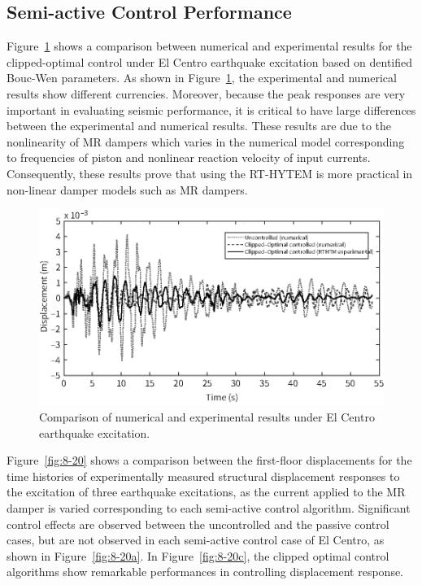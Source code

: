\subsection{Semi-active Control Performance}
Figure~\ref{fig:8-19} shows a comparison between numerical and experimental results for the clipped-optimal control under El Centro earthquake excitation based on dentified Bouc-Wen parameters. As shown in Figure~\ref{fig:8-19}, the experimental and numerical results show different currencies. Moreover, because the peak responses are very important in evaluating seismic performance, it is critical to have large differences between the experimental and numerical results. These results are due to the nonlinearity of MR dampers which varies in the numerical model corresponding to frequencies of piston and nonlinear reaction velocity of input currents. Consequently, these results prove that using the RT-HYTEM is more practical in non-linear damper models such as MR dampers.

\begin{figure}[H]
\centering
\includegraphics[width=1\textwidth] {figure/8-19.eps}
\caption{Comparison of numerical and experimental results under El Centro earthquake excitation.}
\label{fig:8-19}
\end{figure}

Figure~\ref{fig:8-20} shows a comparison between the first-floor displacements for the time histories of experimentally measured structural displacement responses to the excitation of three earthquake excitations, as the current applied to the MR damper is varied corresponding to each semi-active control algorithm. Significant control effects are observed between the uncontrolled and the passive control cases, but are not observed in each semi-active control case of El Centro, as shown in Figure~\ref{fig:8-20a}. In Figure~\ref{fig:8-20c}, the clipped optimal control algorithms show remarkable performances in controlling displacement response.

